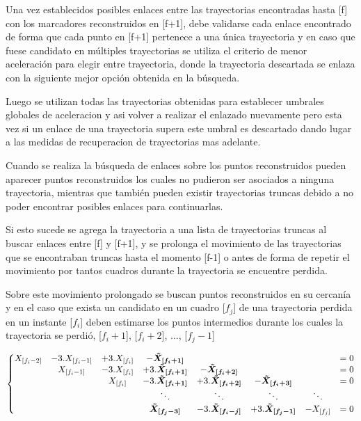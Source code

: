Una vez establecidos posibles enlaces entre las trayectorias encontradas hasta [f] con los marcadores reconstruidos en [f+1], debe validarse cada enlace encontrado de forma que cada punto en [f+1] pertenece a una única trayectoria y en caso que fuese candidato en múltiples trayectorias se utiliza el criterio de menor aceleración para elegir entre trayectoria, donde la trayectoria descartada se enlaza con la siguiente mejor opción obtenida en la búsqueda.

Luego se utilizan todas las trayectorias obtenidas para establecer umbrales globales de aceleracion y asi volver a realizar el enlazado nuevamente pero esta vez si un enlace de una trayectoria supera este umbral es descartado dando lugar a las medidas de recuperacion de trayectorias mas adelante.

Cuando se realiza la búsqueda de enlaces sobre los puntos reconstruidos pueden aparecer puntos reconstruidos los cuales no pudieron ser asociados a ninguna trayectoria, mientras que también pueden existir trayectorias truncas debido a no poder encontrar posibles enlaces para continuarlas.

Si esto sucede se agrega la trayectoria a una lista de trayectorias truncas al buscar enlaces entre [f] y [f+1], y se prolonga el movimiento de las trayectorias que se encontraban truncas hasta el momento [f-1] o antes de forma de repetir el movimiento por tantos cuadros durante la trayectoria se encuentre perdida. 

Sobre este movimiento prolongado se buscan puntos reconstruidos en su cercanía y en el caso que exista un candidato en un cuadro [$f_{j}$] de una trayectoria perdida en un instante [$f_{i}$] deben estimarse los puntos intermedios durante los cuales la trayectoria se perdió, [$f_{i}+1$], [$f_{i}+2$], ..., [$f_{j}-1$]

{\scriptsize \begin{equation}
\hspace{-0cm}
\left\{
\begin{matrix}
X_{[f_{i}-2]} &-3.X_{[f_{i}-1]} &+3.X_{[f_{i}]} &-\boldsymbol{\tilde{X}_{[f_{i}+1]}} & & & &=0 \\
& X_{[f_{i}-1]} &-3.X_{[f_{i}]} &+3.\boldsymbol{\tilde{X}_{[f_{i}+1]}} &-\boldsymbol{\tilde{X}_{[f_{i}+2]}} & & &=0 \\
& & X_{[f_{i}]} &-3.\boldsymbol{\tilde{X}_{[f_{i}+1]}} &+3.\boldsymbol{\tilde{X}_{[f_{i}+2]}} &-\boldsymbol{\tilde{X}_{[f_{i}+3]}}& &=0 \\
& & & \ddots & \ddots & \ddots & \ddots & \\
& & & \boldsymbol{\tilde{X}_{[f_{j}-3]}} &-3.\boldsymbol{\tilde{X}_{[f_{i}-j]}} &+3.\boldsymbol{\tilde{X}_{[f_{j}-1]}} &-X_{[f_{j}]} &=0 \\
\end{matrix}
\right.
\label{ecuaciones_estimacion_n}
\end{equation}}

